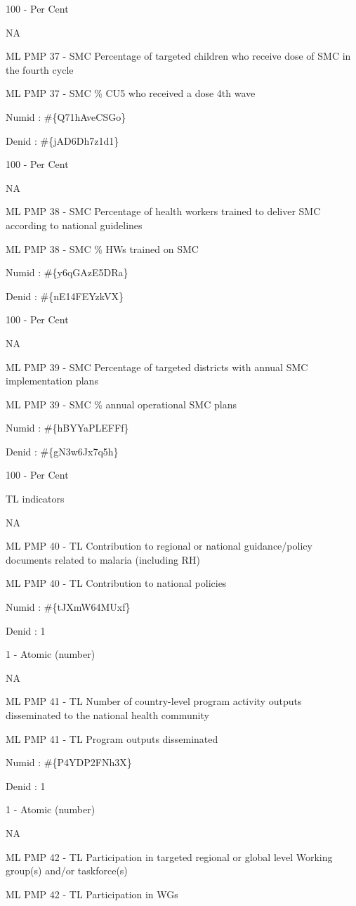 \documentclass[]{book}
\begin{document}
100 - Per Cent

NA

ML PMP 37 - SMC Percentage of targeted children who receive dose of SMC in the fourth cycle

ML PMP 37 - SMC \% CU5 who received a dose 4th wave

Numid : \#\{Q71hAveCSGo\}

Denid : \#\{jAD6Dh7z1d1\}

100 - Per Cent

NA

ML PMP 38 - SMC Percentage of health workers trained to deliver SMC according to national guidelines

ML PMP 38 - SMC \% HWs trained on SMC

Numid : \#\{y6qGAzE5DRa\}

Denid : \#\{nE14FEYzkVX\}

100 - Per Cent

NA

ML PMP 39 - SMC Percentage of targeted districts with annual SMC implementation plans

ML PMP 39 - SMC \% annual operational SMC plans

Numid : \#\{hBYYaPLEFFf\}

Denid : \#\{gN3w6Jx7q5h\}

100 - Per Cent

TL indicators

NA

ML PMP 40 - TL Contribution to regional or national guidance/policy documents related to malaria (including RH)

ML PMP 40 - TL Contribution to national policies

Numid : \#\{tJXmW64MUxf\}

Denid : 1

1 - Atomic (number)

NA

ML PMP 41 - TL Number of country-level program activity outputs disseminated to the national health community

ML PMP 41 - TL Program outputs disseminated

Numid : \#\{P4YDP2FNh3X\}

Denid : 1

1 - Atomic (number)

NA

ML PMP 42 - TL Participation in targeted regional or global level Working group(s) and/or taskforce(s)

ML PMP 42 - TL Participation in WGs
\end{document}
